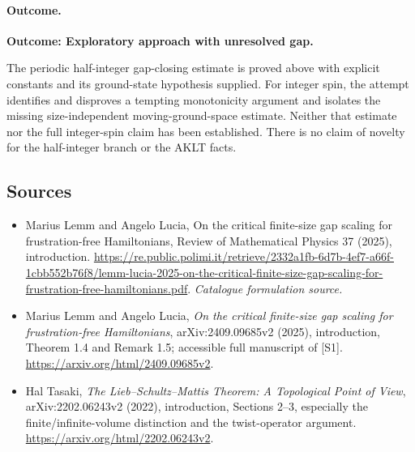 \documentclass[11pt,a4paper]{article}
\numberwithin{equation}{section}
\begin{document}
\paragraph{Outcome.}
\textbf{Outcome: Exploratory approach with unresolved gap.}

The periodic half-integer gap-closing estimate is proved above with explicit
constants and its ground-state hypothesis supplied. For integer spin, the
attempt identifies and disproves a tempting monotonicity argument and
isolates the missing size-independent moving-ground-space estimate.
Neither that estimate nor the full integer-spin claim has been established.
There is no claim of novelty for the half-integer branch or the AKLT facts.
\subsection{Sources}
\begin{itemize}\raggedright
\item[\textnormal{[S1]}]\hypertarget{source:statement:1}{} Marius Lemm and Angelo Lucia, On the critical finite-size gap scaling for frustration-free Hamiltonians, Review of Mathematical Physics 37 (2025), introduction.
\url{https://re.public.polimi.it/retrieve/2332a1fb-6d7b-4ef7-a66f-1cbb552b76f8/lemm-lucia-2025-on-the-critical-finite-size-gap-scaling-for-frustration-free-hamiltonians.pdf}.
{\small\textit{Catalogue formulation source.}}
\item[\textnormal{[E1]}]\hypertarget{extra:statement:1}{} Marius Lemm and Angelo Lucia,
\emph{On the critical finite-size gap scaling for frustration-free Hamiltonians},
arXiv:2409.09685v2 (2025), introduction, Theorem 1.4 and Remark 1.5;
accessible full manuscript of [S1].
\url{https://arxiv.org/html/2409.09685v2}.
\item[\textnormal{[E2]}]\hypertarget{extra:statement:2}{} Hal Tasaki,
\emph{The Lieb--Schultz--Mattis Theorem: A Topological Point of View},
arXiv:2202.06243v2 (2022), introduction, Sections 2--3, especially the
finite/infinite-volume distinction and the twist-operator argument.
\url{https://arxiv.org/html/2202.06243v2}.
\end{itemize}
\end{document}
